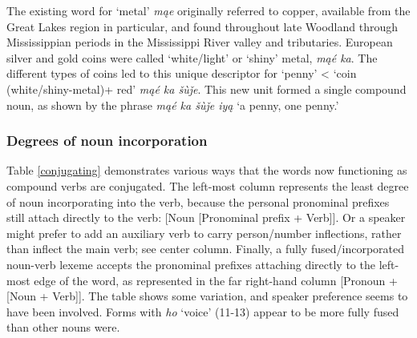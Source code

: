 \documentclass[output=paper]{LSP/langsci}
\begin{document}
The existing word for `metal' \textit{m\k{a}e} originally referred to copper, available from the Great Lakes region in particular, and found throughout late Woodland through Mississippian periods in the Mississippi River valley and tributaries.  European silver and gold coins were called `white/light' or `shiny' metal, \textit{m\k{a}\'e ka}. The different types of coins led to this unique descriptor for `penny' < `coin (white/shiny-metal)+ red' \textit{m\k{a}\'e ka \v{s}\`u\v{j}e}.  This new unit formed a single compound noun, as shown by the phrase \textit{m\k{a}\'e ka \v{s}\`u\v{j}e iy\k{a}} `a penny, one penny.'

\subsubsection{Degrees of  noun incorporation}
Table \ref{conjugating} demonstrates various ways that the words now functioning as compound verbs are conjugated.  The left-most column represents the least degree of noun incorporating into the verb, because the personal pronominal prefixes still attach directly to the verb: [Noun [Pronominal prefix + Verb]]. Or a speaker might prefer to add an auxiliary verb to carry person/number inflections, rather than inflect the main verb; see center column. Finally, a fully fused/incorporated noun-verb lexeme accepts the pronominal prefixes attaching directly to the left-most edge of the word, as represented in the far right-hand column [Pronoun + [Noun + Verb]].  The table shows some variation, and speaker preference seems to have been involved. Forms with \textit{ho} `voice' (11-13) appear to be more fully fused than other nouns were.    
\end{document}
